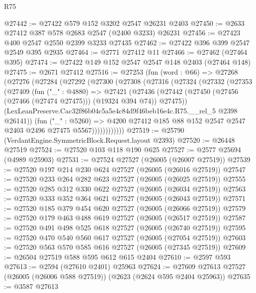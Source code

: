\begin{lexlean}{R75}
\begin{coremodule}
@27442 := @27422 @579 @152 @3202 @2547 @26231 @2403
@27450 := @2633 @27412 @387 @578 @2683 @2547 (@2400 @3233) @26231
@27456 := @27423 @400 @2547 @2550 @2399 @3233 @27435
@27462 := @27422 @396 @399 @2547 @2549 @395 @2935
@27464 := @2771 @27412 @11
@27466 := @27462 (@27464 @395)
@27474 := @27422 @149 @152 @2547 @2547 @148 @2403 (@27464 @148)
@27475 := @2671 @27412
@27516 := @27253
    (fun (word : @66) =>
    @27268
      (@27276
        (@27284
          (@27292
            (@27300
              (@27308
                (@27316
                  (@27324
                    (@27332
                      (@27353
                        (@27409
                          (fun ("_" : @4880) =>
                          @27421
                            (@27436
                              (@27442
                                (@27450 (@27456 (@27466 (@27474 @27475))) (@19324 @394 @74))
                                @27475))
                            (LexLeanPreserve.Cac32f86b04c5a5e4c84d9f46beb16e4c.R75.__rel_5
                              @2398
                              @26141))
                          (fun ("_" : @5260) =>
                          @4200
                            @27412
                            @185
                            @88
                            @152
                            @2547
                            @2547
                            @2403
                            @2496
                            @27475
                            @5567))))))))))))
@27519 := @25790 (VerdantEngine.SymmetricBlock.Request.layout @2393)
@27520 := @26448 @27519
@27524 := @27520 @103 @118 @190 @625
@27527 := @2577 @25694 (@4989 @25903)
@27531 := @27524 @27527 (@26005 (@26007 @27519))
@27539 := @27520 @197 @214 @230 @624 @27527 (@26005 (@26016 @27519))
@27547 := @27520 @233 @264 @282 @623 @27527 (@26005 (@26025 @27519))
@27555 := @27520 @285 @312 @330 @622 @27527 (@26005 (@26034 @27519))
@27563 := @27520 @333 @352 @364 @621 @27527 (@26005 (@26043 @27519))
@27571 := @27520 @185 @379 @454 @620 @27527 (@26005 (@26066 @27519))
@27579 := @27520 @179 @463 @488 @619 @27527 (@26005 (@26517 @27519))
@27587 := @27520 @491 @498 @525 @618 @27527 (@26005 (@26740 @27519))
@27595 := @27520 @470 @540 @560 @617 @27527 (@26005 (@27054 @27519))
@27603 := @27520 @563 @570 @585 @616 @27527 (@26005 (@27345 @27519))
@27609 := @26504 @27519 @588 @595 @612 @615 @2404
@27610 := @2597 @593
@27613 := @2594 (@27610 @2401) @25963
@27624 := @27609 @27613 @27527 (@26005 (@26006 @588 @27519)) (@2623 (@2624 @595 @2404 @25963))
@27635 := @3587
    @27613

\end{coremodule}
\end{lexlean}
